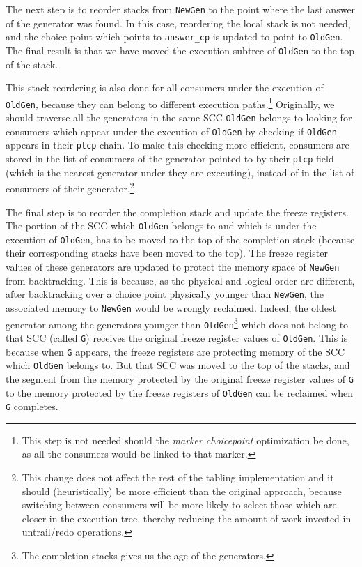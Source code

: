 \documentclass{./tlp}
\begin{document}
The next step is to reorder stacks from \lstinline{NewGen} to the
point where the last answer of the generator was found.  In this case,
reordering the local stack is not needed, and  the choice point
which points to \lstinline{answer_cp} is updated to point to
\lstinline{OldGen}.  The final result is that we have moved the
execution subtree of \lstinline{OldGen} to the top of the stack.

This stack reordering is also done for all consumers under the
execution of \lstinline{OldGen}, because they can belong to different
execution paths.\footnote{This step is not needed should the
  \emph{marker choicepoint} optimization be done, as all the consumers
  would be linked to that marker.}  Originally, we should traverse all
the generators in the same SCC \lstinline{OldGen} belongs to looking
for consumers which appear under the execution of \lstinline{OldGen}
by checking if \lstinline{OldGen} appears in their \lstinline{ptcp}
chain.  To make this checking more efficient, consumers are stored in the
list of consumers of the generator pointed to by their
\lstinline{ptcp} field (which is the nearest generator under they are
executing), instead of in the list of consumers of their
generator.\footnote{This change does not affect the rest of the
  tabling implementation and it should (heuristically) be more
  efficient than the original approach, because switching between
  consumers will be more likely to select those which are closer in
  the execution tree, thereby reducing the amount of work invested in
  untrail/redo operations.}


The final step is to reorder the completion stack and update the
freeze registers.  The portion of the SCC which \lstinline{OldGen}
belongs to and which is under the execution of \lstinline{OldGen}, has
to be moved to the top of the completion stack (because their
corresponding stacks have been moved to the top).  The freeze register
values of these generators are updated to protect the memory space of
\lstinline{NewGen} from backtracking.  This is because, as the
physical and logical order are different, after backtracking over a
choice point physically younger than \lstinline{NewGen}, the
associated memory to \lstinline{NewGen} would be wrongly reclaimed.
Indeed, the oldest generator among the generators younger than
\lstinline{OldGen}\footnote{The completion stacks gives us the age of
  the generators.} which does not belong to that SCC (called
\lstinline{G}) receives the original freeze register values of
\lstinline{OldGen}.  This is because when \lstinline{G} appears,
the freeze registers are protecting memory of the SCC which
\lstinline{OldGen} belongs to.  But that SCC was moved to the top
of the stacks, 
and the segment from the memory protected by the original freeze
register values of \lstinline{G} to the memory protected by the freeze
registers of \lstinline{OldGen} can be reclaimed when \lstinline{G}
completes.
\end{document}

